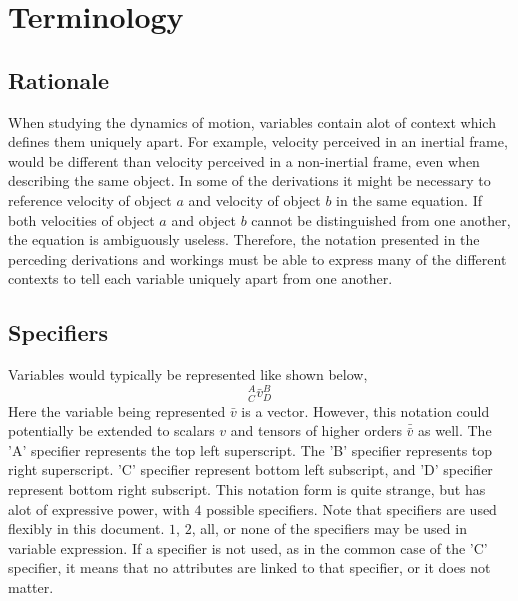 \chapter{Terminology}
\begin{comment}
\end{comment}
\section{Rationale}
\begin{comment}
\end{comment}
When studying the dynamics of motion, variables contain alot of context which defines them uniquely apart. For example, velocity perceived in an inertial frame, would be different than velocity perceived in a non-inertial frame, even when describing the same object. In some of the derivations it might be necessary to reference velocity of object $a$ and velocity of object $b$ in the same equation. If both velocities of object $a$ and object $b$ cannot be distinguished from one another, the equation is ambiguously useless. Therefore, the notation presented in the perceding derivations and workings must be able to express many of the different contexts to tell each variable uniquely apart from one another.
\section{Specifiers}
\begin{comment}
\end{comment}
Variables would typically be represented like shown below,
$${}^{A}_{C}\bar{v}^{B}_{D}$$
Here the variable being represented $\bar{v}$ is a vector. However, this notation could potentially be extended to scalars $v$ and tensors of higher orders $\bar{\bar{v}}$ as well. The 'A' specifier represents the top left superscript. The 'B' specifier represents top right superscript. 'C' specifier represent bottom left subscript, and 'D' specifier represent bottom right subscript. This notation form is quite strange, but has alot of expressive power, with $4$ possible specifiers. Note that specifiers are used flexibly in this document. $1$, $2$, all, or none of the specifiers may be used in variable expression. If a specifier is not used, as in the common case of the 'C' specifier, it means that no attributes are linked to that specifier, or it does not matter. 
